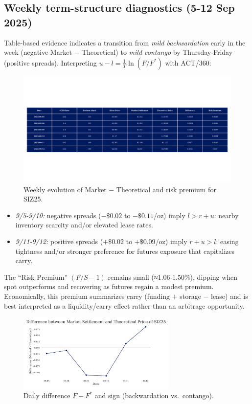 \documentclass[11pt,a4paper]{article} %
\begin{document}
\subsection{Weekly term-structure diagnostics (5-12 Sep 2025)}
Table-based evidence indicates a transition from \emph{mild backwardation} early in the week (negative Market \(-\) Theoretical) to \emph{mild contango} by Thursday-Friday (positive spreads). Interpreting \(u-l=\tfrac{1}{T}\ln(F/F^{*})\) with ACT/360:

\begin{figure}[h]
\centering
\includegraphics[width=1\textwidth]{figures/silver_pricing_over_the_week.pdf}
\caption{Weekly evolution of Market \(-\) Theoretical and risk premium for SIZ25.}
\label{fig:silver_week}
\end{figure}

\begin{itemize}
  \item \textit{9/5-9/10:} negative spreads (\(-\$0.02\) to \(-\$0.11\)/oz) imply \(l>r+u\): nearby inventory scarcity and/or elevated lease rates.
  \item \textit{9/11-9/12:} positive spreads (\(+\$0.02\) to \(+\$0.09\)/oz) imply \(r+u>l\): easing tightness and/or stronger preference for futures exposure that capitalizes carry.
\end{itemize}
The “Risk Premium” \((F/S-1)\) remains small (≈1.06-1.50\%), dipping when spot outperforms and recovering as futures regain a modest premium. Economically, this premium summarizes carry (funding \(+\) storage \(-\) lease) and is best interpreted as a liquidity/carry effect rather than an arbitrage opportunity.

\begin{figure}[h]
\centering
\includegraphics[width=0.7\textwidth]{figures/silver_difference.pdf}
\caption{Daily difference \(F-F^{*}\) and sign (backwardation vs.\ contango).}
\label{fig:silver_difference}
\end{figure}
\end{document}

